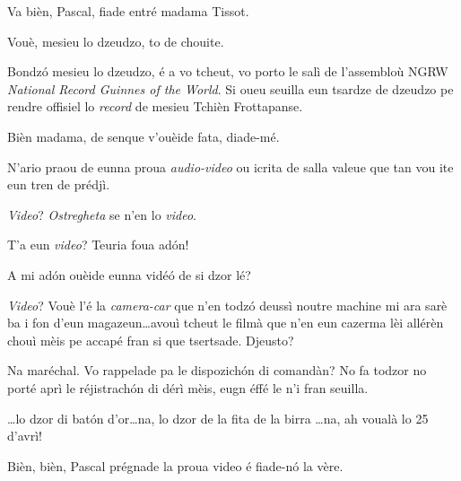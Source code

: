 \begin{drama}
\DzeudzoSenliquerspeaks Va bièn, Pascal, fiade entré madama Tissot.

\Pascalspeaks Vouè, mesieu lo dzeudzo, to de chouite.


\Tissotspeaks Bondzó mesieu lo dzeudzo, é a vo tcheut, vo porto le salì de l'assembloù NGRW \textit{National Record Guinnes of the World}. Si oueu seuilla eun tsardze de dzeudzo pe rendre offisiel lo \textit{record} de mesieu Tchièn Frottapanse.

\DzeudzoSenliquerspeaks {} Bièn madama, de senque v'ouèide fata, diade-mé.

\Tissotspeaks N’ario praou de eunna proua \textit{audio-video} ou icrita de salla valeue que tan vou ite eun tren de prédjì.

\Tacspeaks \textit{Video}? \textit{Ostregheta} se n’en lo \textit{video}.

\Cienspeaks T'a eun \textit{video}? Teuria foua adón!

\DzeudzoSenliquerspeaks {} A mi adón ouèide eunna vidé\'o de si dzor lé?

\Ticspeaks {} \textit{Video}? Vouè l’é la \textit{camera-car} que n’en todzó deussì noutre machine mi ara sarè ba i fon d'eun magazeun\ldots avouì tcheut le filmà que n’en eun cazerma lèi allérèn chouì mèis pe accapé fran si que tsertsade.  Djeusto?

\Tacspeaks Na maréchal. Vo rappelade pa le dispozichón di comandàn? No fa todzor no porté aprì le réjistrachón di dérì mèis, eugn éffé le n’i fran seuilla. 


\Tacspeaks \ldots lo dzor di bat\'on d'or\ldots na, lo dzor de la fita de la birra \ldots na, ah voualà lo 25 d'avrì!

\DzeudzoSenliquerspeaks Bièn, bièn, Pascal prégnade la proua video é fiade-n\'o la vère.




\end{drama}
